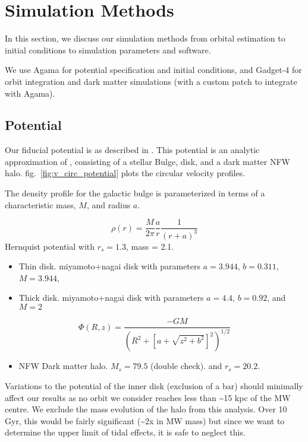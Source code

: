 \section{Simulation Methods}\label{simulation-methods}

In this section, we discuss our simulation methods from orbital
estimation to initial conditions to simulation parameters and software.

We use Agama \citep{agama} for potential specification and initial
conditions, and Gadget-4 \citep{gadget4} for orbit integration and dark
matter simulations (with a custom patch to integrate with Agama).

\subsection{Potential}\label{potential}

Our fiducial potential is as described in \citet{EP2020}. This potential
is an analytic approximation of \citet{McMillan2011}, consisting of a
stellar Bulge, disk, and a dark matter NFW halo.
fig.~\ref{fig:v_circ_potential} plots the circular velocity profiles.

The \citet{hernquist1990} density profile for the galactic bulge is
parameterized in terms of a characteristic mass, \(M\), and radius
\(a\).

\[
\rho(r) = \frac{M}{2\pi} \frac{a}{r} \frac{1}{(r+a)^3}
\] Hernquist potential with \(r_s=1.3\), mass = 2.1.

\begin{itemize}
\tightlist
\item
  Thin disk. miyamoto+nagai disk with parameters \(a=3.944\),
  \(b=0.311\), \(M=3.944\),
\item
  Thick disk. miyamoto+nagai disk with parameters \(a=4.4\), \(b=0.92\),
  and \(M=2\)
\end{itemize}

\[
\Phi(R, z) = \frac{-GM}{\left(R^2 + \left[a + \sqrt{z^2 + b^2}\right]^{2}\right)^{1/2}}
\]

\begin{itemize}
\tightlist
\item
  NFW Dark matter halo. \(M_s=79.5\) (double check). and \(r_s = 20.2\).
\end{itemize}

Variations to the potential of the inner disk (exclusion of a bar)
should minimally affect our results as no orbit we consider reaches less
than \textasciitilde15 kpc of the MW centre. We exclude the mass
evolution of the halo from this analysis. Over 10 Gyr, this would be
fairly significant (\textasciitilde2x in MW mass) but since we want to
determine the upper limit of tidal effects, it is safe to neglect this.

